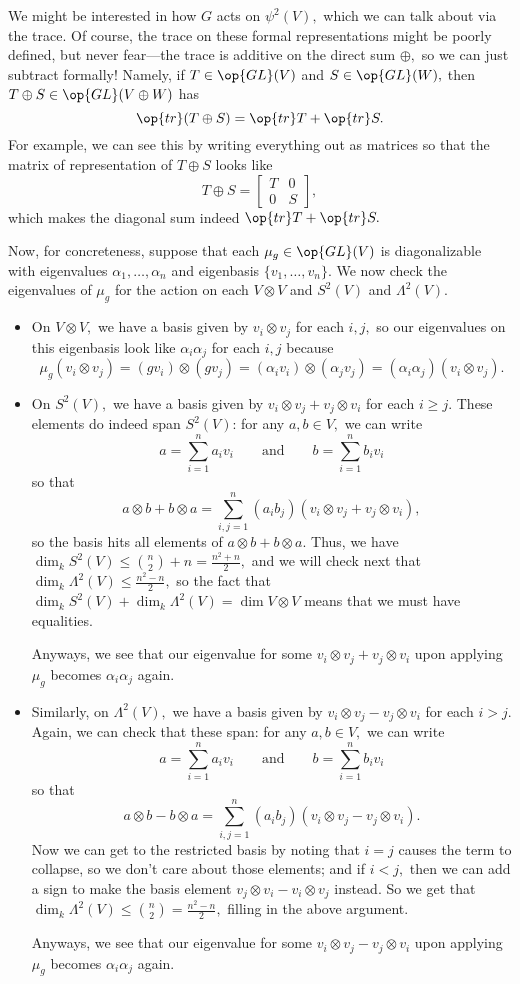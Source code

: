We might be interested in how $G$ acts on $\psi^2(V),$ which we can talk about via the trace. Of course, the trace on these formal representations might be poorly defined, but never fear---the trace is additive on the direct sum $\oplus,$ so we can just subtract formally! Namely, if $T\in\op{GL}(V)$ and $S\in\op{GL}(W),$ then $T\oplus S\in\op{GL}(V\oplus W)$ has
\[\op{tr}(T\oplus S)=\op{tr}T+\op{tr}S.\]
For example, we can see this by writing everything out as matrices so that the matrix of representation of $T\oplus S$ looks like
\[T\oplus S=\begin{bmatrix}
	T & 0 \\
	0 & S
\end{bmatrix},\]
which makes the diagonal sum indeed $\op{tr}T+\op{tr}S.$

Now, for concreteness, suppose that each $\mu_g\in\op{GL}(V)$ is diagonalizable with eigenvalues $\alpha_1,\ldots,\alpha_n$ and eigenbasis $\{v_1,\ldots,v_n\}.$ We now check the eigenvalues of $\mu_g$ for the action on each $V\otimes V$ and $S^2(V)$ and $\Lambda^2(V).$
\begin{itemize}
	\item On $V\otimes V,$ we have a basis given by $v_i\otimes v_j$ for each $i,j,$ so our eigenvalues on this eigenbasis look like $\alpha_i\alpha_j$ for each $i,j$ because
	\[\mu_g(v_i\otimes v_j)=(gv_i)\otimes(gv_j)=(\alpha_iv_i)\otimes(\alpha_jv_j)=(\alpha_i\alpha_j)(v_i\otimes v_j).\]
	\item On $S^2(V),$ we have a basis given by $v_i\otimes v_j+v_j\otimes v_i$ for each $i\ge j.$ These elements do indeed span $S^2(V)$: for any $a,b\in V,$ we can write
	\[a=\sum_{i=1}^na_iv_i\qquad\text{and}\qquad b=\sum_{i=1}^nb_iv_i\]
	so that
	\[a\otimes b+b\otimes a=\sum_{i,j=1}^n(a_ib_j)(v_i\otimes v_j+v_j\otimes v_i),\]
	so the basis hits all elements of $a\otimes b+b\otimes a.$ Thus, we have $\dim_kS^2(V)\le\binom n2+n=\frac{n^2+n}2,$ and we will check next that $\dim_k\Lambda^2(V)\le\frac{n^2-n}2,$ so the fact that $\dim_kS^2(V)+\dim_k\Lambda^2(V)=\dim V\otimes V$ means that we must have equalities.

	Anyways, we see that our eigenvalue for some $v_i\otimes v_j+v_j\otimes v_i$ upon applying $\mu_g$ becomes $\alpha_i\alpha_j$ again.
	\item Similarly, on $\Lambda^2(V),$ we have a basis given by $v_i\otimes v_j-v_j\otimes v_i$ for each $i>j.$ Again, we can check that these span: for any $a,b\in V,$ we can write
	\[a=\sum_{i=1}^na_iv_i\qquad\text{and}\qquad b=\sum_{i=1}^nb_iv_i\]
	so that
	\[a\otimes b-b\otimes a=\sum_{i,j=1}^n(a_ib_j)(v_i\otimes v_j-v_j\otimes v_i).\]
	Now we can get to the restricted basis by noting that $i=j$ causes the term to collapse, so we don't care about those elements; and if $i<j,$ then we can add a sign to make the basis element $v_j\otimes v_i-v_i\otimes v_j$ instead. So we get that $\dim_k\Lambda^2(V)\le\binom n2=\frac{n^2-n}2,$ filling in the above argument.

	Anyways, we see that our eigenvalue for some $v_i\otimes v_j-v_j\otimes v_i$ upon applying $\mu_g$ becomes $\alpha_i\alpha_j$ again.
\end{itemize}
